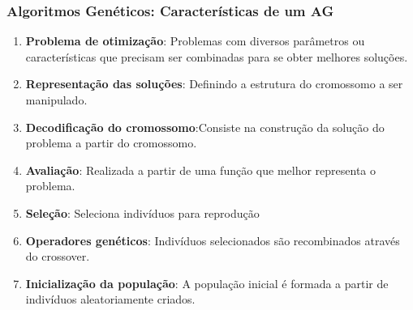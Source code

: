 \documentclass[11pt]{beamer}
\begin{document}
	\begin{frame}
		\frametitle{Algoritmos Genéticos: Características de um AG}
		\begin{enumerate}
			\item \textbf{Problema de otimização}: Problemas com diversos parâmetros ou características que precisam ser combinadas para se obter melhores soluções.
			\item  \textbf{Representação das soluções}: Definindo a estrutura do cromossomo a ser manipulado.
			\item  \textbf{Decodificação do cromossomo}:Consiste na construção da solução do problema a partir do cromossomo.
			\item \textbf{Avaliação}: Realizada a partir de uma função que melhor representa o problema.
			\item \textbf{Seleção}: Seleciona indivíduos para reprodução
			\item  \textbf{Operadores genéticos}: Indivíduos selecionados são recombinados através do crossover.
			\item  \textbf{Inicialização da população}: A população inicial é
			formada a partir de indivíduos aleatoriamente criados.
		\end{enumerate}
	\end{frame}
\end{document}
